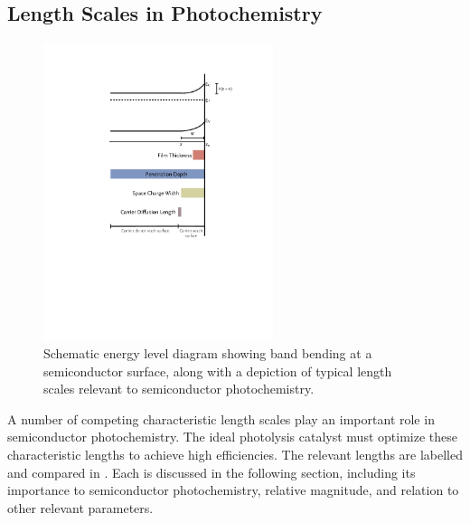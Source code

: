 \subsection{Length Scales in Photochemistry}
\label{subsec:background.lengthscales} %

\begin{figure}
\begin{center}
\includegraphics[width=0.6\textwidth]{lengthscales.pdf}
\caption[Band bending at semiconductor surface]{%
	Schematic energy level diagram showing band bending at a semiconductor 
	surface, along with a depiction of typical length scales relevant to 
	semiconductor photochemistry.}
\label{fig:lengthscales}
\end{center}
\end{figure}

A number of competing characteristic length scales play an important role in semiconductor
photochemistry. The ideal photolysis catalyst must optimize these characteristic lengths
to achieve high efficiencies. The relevant lengths are labelled and compared in
. Each is discussed in the following section, including its
importance to semiconductor photochemistry, relative magnitude, and relation to other
relevant parameters.

